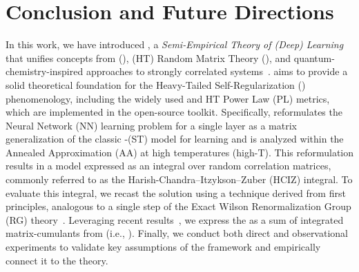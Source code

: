 \section{Conclusion and Future Directions}
\label{sxn:conclusions}

In this work, we have introduced \SETOL, a \emph{Semi-Empirical Theory of (Deep) Learning}
that unifies concepts from \StatisticalMechanics (\STATMECH), \HeavyTailed (HT) Random Matrix Theory (\RMT), and quantum-chemistry-inspired approaches to strongly correlated systems~\cite{Martin1996HighlyAA,martin1996redesigning,martin_reparametrizing_1998}. \SETOL aims to provide a solid theoretical foundation for the Heavy-Tailed Self-Regularization (\HTSR) phenomenology, including the widely used \ALPHA and \ALPHAHAT HT Power Law (PL) \LayerQuality metrics, which are implemented in the open-source \WW toolkit. Specifically, \SETOL reformulates the Neural Network (NN) learning problem for a single layer as a matrix generalization of the classic \Student-\Teacher (ST) model for \Perceptron learning
and is analyzed within the Annealed Approximation (AA) at high temperatures (high-T).
This reformulation results in a model expressed as an integral over random \Student correlation matrices, commonly referred to as the Harish-Chandra–Itzykson–Zuber (HCIZ) integral. To evaluate this integral, we recast the solution using a technique derived from first principles, analogous to a single step of the Exact Wilson Renormalization Group (RG) theory~\cite{WilsonRG}. Leveraging recent results~\cite{Tanaka2007,Tanaks2008}, we express the \LayerQuality as a sum of integrated matrix-cumulants from \RMT (i.e., \RTransforms). Finally, we conduct both direct and observational experiments to validate key assumptions of the \SETOL framework and empirically connect it to the \HTSR theory.


